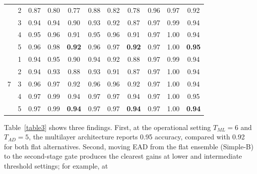\documentclass[12pt]{article}
\begin{document}
\begin{table}[H]
\begin{tabular}{rrrrrrrrrrr}
            \multicolumn{1}{c}{} & \multicolumn{1}{c}{2}& 0.87 & 0.80 & \multicolumn{1}{c}{0.77} & 0.88 & 0.82 & \multicolumn{1}{c}{0.78} & 0.96 & 0.97 & \multicolumn{1}{c}{0.92}  \\
            \multicolumn{1}{c}{} & \multicolumn{1}{c}{3}& 0.94 & 0.94 & \multicolumn{1}{c}{0.90} & 0.93 & 0.92 & \multicolumn{1}{c}{0.87}  & 0.97 & 0.99 & \multicolumn{1}{c}{0.94} \\
            \multicolumn{1}{c}{} & \multicolumn{1}{c}{4}& 0.95 & 0.96 & \multicolumn{1}{c}{0.91} & 0.95 & 0.96 & \multicolumn{1}{c}{0.91} & 0.97 & 1.00 & \multicolumn{1}{c}{0.94}   \\
            \multicolumn{1}{c}{} & \multicolumn{1}{c}{5}& 0.96 & 0.98 & \multicolumn{1}{c}{\textbf{0.92}} & 0.96 & 0.97 & \multicolumn{1}{c}{\textbf{0.92}} & 0.97 & 1.00 & \multicolumn{1}{c}{\textbf{0.95}}  \\
            \hline
            \multicolumn{1}{c}{\multirow{5}{*}{7}} & \multicolumn{1}{c}{1}& 0.94 & 0.95 & \multicolumn{1}{c}{0.90} & 0.94 & 0.92 & \multicolumn{1}{c}{0.88} & 0.97 & 0.99 & \multicolumn{1}{c}{0.94}  \\
            \multicolumn{1}{c}{} & \multicolumn{1}{c}{2}& 0.94 & 0.93 & \multicolumn{1}{c}{0.88} & 0.93 & 0.91 & \multicolumn{1}{c}{0.87} & 0.97 & 1.00 & \multicolumn{1}{c}{0.94}  \\
            \multicolumn{1}{c}{} & \multicolumn{1}{c}{3}& 0.96 & 0.97 & \multicolumn{1}{c}{0.92} & 0.96 & 0.96 & \multicolumn{1}{c}{0.92} & 0.97 & 1.00 & \multicolumn{1}{c}{0.94}  \\
            \multicolumn{1}{c}{} & \multicolumn{1}{c}{4}& 0.97 & 0.99 & \multicolumn{1}{c}{0.94} & 0.97 & 0.97 & \multicolumn{1}{c}{0.94} & 0.97 & 1.00 & \multicolumn{1}{c}{0.95}   \\
            \multicolumn{1}{c}{} & \multicolumn{1}{c}{5}& 0.97 & 0.99 & \multicolumn{1}{c}{\textbf{0.94}} & 0.97 & 0.97 & \multicolumn{1}{c}{\textbf{0.94}} & 0.97 & 1.00 & \multicolumn{1}{c}{\textbf{0.94}} \\
            \hline
        \end{tabular}
    \end{table}
Table~\ref{table3} shows three findings. First, at the operational setting
$T_{ML}=6$ and $T_{AD}=5$, the multilayer architecture reports 0.95 accuracy,
compared with 0.92 for both flat alternatives. Second, moving EAD from the flat
ensemble (Simple-B) to the second-stage gate produces the clearest gains at
lower and intermediate threshold settings; for example, at
\end{document}
